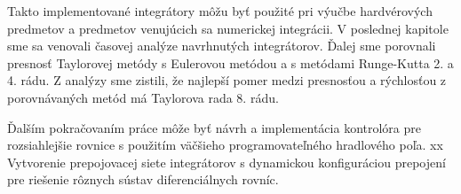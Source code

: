 Takto implementované integrátory môžu byť použité pri výučbe hardvérových predmetov a predmetov venujúcich sa numerickej integrácii. V poslednej kapitole sme sa venovali časovej analýze navrhnutých integrátorov. Ďalej sme porovnali presnosť Taylorovej metódy s Eulerovou metódou a s metódami Runge-Kutta 2. a 4. rádu. Z analýzy sme zistili, že najlepší pomer medzi presnosťou a rýchlosťou z porovnávaných metód má Taylorova rada 8. rádu.

Ďalším pokračovaním práce môže byť návrh a implementácia kontrolóra pre rozsiahlejšie rovnice s použitím väčšieho programovateľného hradlového poľa. xx Vytvorenie prepojovacej siete integrátorov s dynamickou konfiguráciou prepojení pre riešenie rôznych sústav diferenciálnych rovníc.

